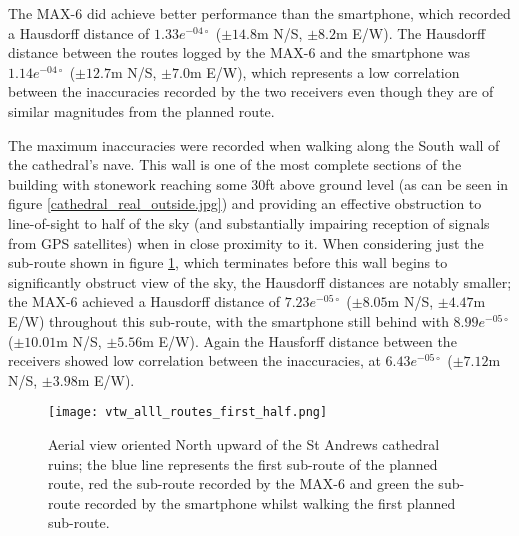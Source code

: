The MAX-6 did achieve better performance than the smartphone, which recorded a Hausdorff distance of $1.33e^{-04\circ}$ ($\pm14.8$m N/S, $\pm8.2$m E/W). The Hausdorff distance between the routes logged by the MAX-6 and the smartphone was $1.14e^{-04\circ}$ ($\pm12.7$m N/S, $\pm7.0$m E/W), which represents a low correlation between the inaccuracies recorded by the two receivers even though they are of similar magnitudes from the planned route.

The maximum inaccuracies were recorded when walking along the South wall of the cathedral's nave. This wall is one of the most complete sections of the building with stonework reaching some 30ft above ground level (as can be seen in figure \ref{cathedral_real_outside.jpg}) and providing an effective obstruction to line-of-sight to half of the sky (and substantially impairing reception of signals from GPS satellites) when in close proximity to it. When considering just the sub-route shown in figure \ref{vtw_alll_routes_first_half.png}, which terminates before this wall begins to significantly obstruct view of the sky, the Hausdorff distances are notably smaller; the MAX-6 achieved a Hausdorff distance of $7.23e^{-05\circ}$ ($\pm8.05$m N/S, $\pm4.47$m E/W) throughout this sub-route, with the smartphone still behind with $8.99e^{-05\circ}$ ($\pm10.01$m N/S, $\pm5.56$m E/W). Again the Hausforff distance between the receivers showed low correlation between the inaccuracies, at $6.43e^{-05\circ}$ ($\pm7.12$m N/S, $\pm3.98$m E/W).
 
\begin{figure}[h]
\centering
\texttt{[image: vtw\_alll\_routes\_first\_half.png]}
\caption{Aerial view oriented North upward of the St Andrews cathedral ruins; the blue line represents the first sub-route of the planned route, red the sub-route recorded by the MAX-6 and green the sub-route recorded by the smartphone whilst walking the first planned sub-route.}
\label{vtw_alll_routes_first_half.png}
\end{figure}

